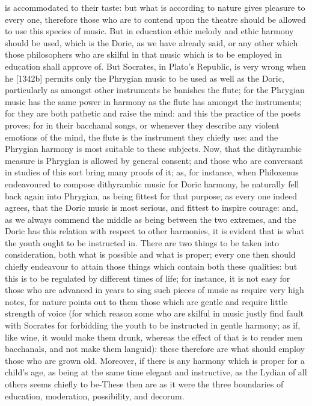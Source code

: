 \documentclass[12pt]{article}
\begin{document}
is accommodated to their taste: but what is according to nature gives pleasure to every one, therefore those who are to contend upon the theatre should be allowed to use this species of music. But in education ethic melody and ethic harmony should be used, which is the Doric, as we have already said, or any other which those philosophers who are skilful in that music which is to be employed in education shall approve of. But Socrates, in Plato's Republic, is very wrong when he [1342b] permits only the Phrygian music to be used as well as the Doric, particularly as amongst other instruments he banishes the flute; for the Phrygian music has the same power in harmony as the flute has amongst the instruments; for they are both pathetic and raise the mind: and this the practice of the poets proves; for in their bacchanal songs, or whenever they describe any violent emotions of the mind, the flute is the instrument they chiefly use: and the Phrygian harmony is most suitable to these subjects. Now, that the dithyrambic measure is Phrygian is allowed by general consent; and those who are conversant in studies of this sort bring many proofs of it; as, for instance, when Philoxenus endeavoured to compose dithyrambic music for Doric harmony, he naturally fell back again into Phrygian, as being fittest for that purpose; as every one indeed agrees, that the Doric music is most serious, and fittest to inspire courage: and, as we always commend the middle as being between the two extremes, and the Doric has this relation with respect to other harmonies, it is evident that is what the youth ought to be instructed in. There are two things to be taken into consideration, both what is possible and what is proper; every one then should chiefly endeavour to attain those things which contain both these qualities: but this is to be regulated by different times of life; for instance, it is not easy for those who are advanced in years to sing such pieces of music as require very high notes, for nature points out to them those which are gentle and require little strength of voice (for which reason some who are skilful in music justly find fault with Socrates for forbidding the youth to be instructed in gentle harmony; as if, like wine, it would make them drunk, whereas the effect of that is to render men bacchanals, and not make them languid): these therefore are what should employ those who are grown old. Moreover, if there is any harmony which is proper for a child's age, as being at the same time elegant and instructive, as the Lydian of all others seems chiefly to be-These then are as it were the three boundaries of education, moderation, possibility, and decorum.
\end{document}
